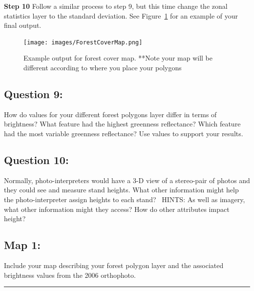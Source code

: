 \documentclass[
  letterpaper,
]{book}
\begin{document}
\textbf{Step 10} Follow a similar process to step 9, but this time
change the zonal statistics layer to the standard deviation. See
Figure~\ref{fig-2} for an example of your final output.

\begin{figure}

{\centering \texttt{[image: images/ForestCoverMap.png]}

}

\caption{\label{fig-2}Example output for forest cover map. **Note your
map will be different according to where you place your polygons}

\end{figure}

\hypertarget{question-9-1}{%
\subsection*{Question 9:}\label{question-9-1}}

How do values for your different forest polygons layer differ in terms
of brightness? What feature had the highest greenness reflectance? Which
feature had the most variable greenness reflectance? Use values to
support your results.

\hypertarget{question-10-1}{%
\subsection*{Question 10:}\label{question-10-1}}

Normally, photo-interpreters would have a 3-D view of a stereo-pair of
photos and they could see and measure stand heights. What other
information might help the photo-interpreter assign heights to each
stand?~ HINTS: As well as imagery, what other information might they
access? How do other attributes impact height?

\hypertarget{map-1-1}{%
\subsection*{Map 1:}\label{map-1-1}}

Include your map describing your forest polygon layer and the associated
brightness values from the 2006 orthophoto.

\begin{center}\rule{0.5\linewidth}{0.5pt}\end{center}
\end{document}
